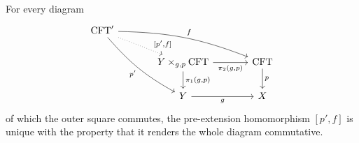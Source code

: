 \begin{thm}\label{cobesys-pullback}
For every diagram
\begin{equation*}
\begin{tikzcd}[column sep=large]
\stesys'
  \ar[bend right=10]{ddr}[swap]{p'}
  \ar[bend left=10]{rrd}{f}
  \ar[dotted]{dr}[near end]{[p',f]}
  \\
  {}&
\cobesys{Y}{\stesys}{g}{p}
  \ar{d}{\pullbackpr{1}{g}{p}}
  \ar{r}[swap]{\pullbackpr{2}{g}{p}}
  &
\stesys
  \ar{d}{p}
  \\
  {}&
Y \ar{r}[swap]{g}
  &
X
\end{tikzcd}
\end{equation*}
of which the outer square commutes, the pre-extension homomorphism $[p',f]$
is unique with the property that it renders the whole diagram commutative.
\end{thm}

